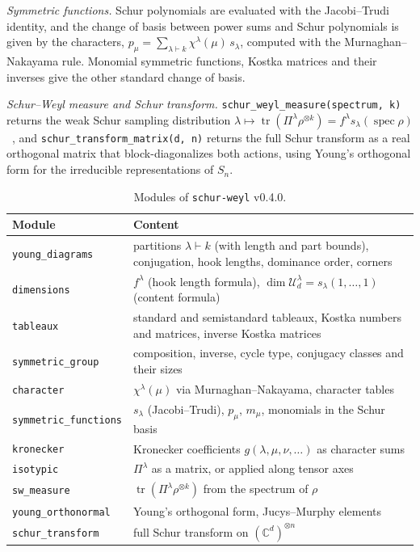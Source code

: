 \documentclass[aps,pra,twocolumn,superscriptaddress,groupedaddress]{revtex4-2}
\newcommand{\C}{\mathds{C}}
\newcommand{\code}[1]{\texttt{#1}}
\DeclareMathOperator{\tr}{tr}
\DeclareMathOperator{\spec}{spec}
\begin{document}
\emph{Symmetric functions.} Schur polynomials are evaluated with the
Jacobi--Trudi identity, and the change of basis between power sums and Schur
polynomials is given by the characters,
$p_\mu=\sum_{\lambda\vdash k}\chi^\lambda(\mu)\,s_\lambda$, computed with the
Murnaghan--Nakayama rule. Monomial symmetric functions, Kostka matrices and
their inverses give the other standard change of basis.

\emph{Schur--Weyl measure and Schur transform.}
\code{schur\_weyl\_measure(spectrum, k)} returns the weak Schur sampling
distribution $\lambda\mapsto\tr(\Pi^\lambda\rho^{\otimes k})
=f^\lambda s_\lambda(\spec\rho)$~\cite{Keyl2001}, and
\code{schur\_transform\_matrix(d, n)} returns the full Schur transform as a
real orthogonal matrix that block-diagonalizes both actions, using Young's
orthogonal form for the irreducible representations of $S_n$.

\begin{table}[t]
\caption{Modules of \code{schur-weyl} v0.4.0.}
\label{tab:sw}
\begin{ruledtabular}
\begin{tabular}{lp{4.6cm}}
Module & Content \\
\hline
\code{young\_diagrams} & partitions $\lambda\vdash k$ (with length and part bounds), conjugation, hook lengths, dominance order, corners \\
\code{dimensions} & $f^\lambda$ (hook length formula), $\dim\mathcal{U}^\lambda_d=s_\lambda(1,\dots,1)$ (content formula) \\
\code{tableaux} & standard and semistandard tableaux, Kostka numbers and matrices, inverse Kostka matrices \\
\code{symmetric\_group} & composition, inverse, cycle type, conjugacy classes and their sizes \\
\code{character} & $\chi^\lambda(\mu)$ via Murnaghan--Nakayama, character tables \\
\code{symmetric\_functions} & $s_\lambda$ (Jacobi--Trudi), $p_\mu$, $m_\mu$, monomials in the Schur basis \\
\code{kronecker} & Kronecker coefficients $g(\lambda,\mu,\nu,\dots)$ as character sums \\
\code{isotypic} & $\Pi^\lambda$ as a matrix, or applied along tensor axes \\
\code{sw\_measure} & $\tr(\Pi^\lambda\rho^{\otimes k})$ from the spectrum of $\rho$ \\
\code{young\_orthonormal} & Young's orthogonal form, Jucys--Murphy elements \\
\code{schur\_transform} & full Schur transform on $(\C^d)^{\otimes n}$ \\
\end{tabular}
\end{ruledtabular}
\end{table}
\end{document}
